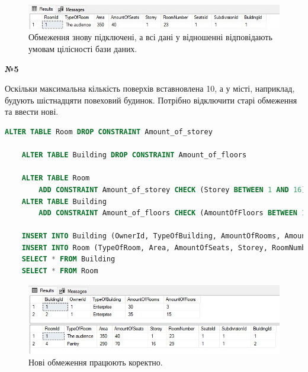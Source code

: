 \documentclass[a4paper,12pt]{article}
\begin{document}
	\begin{figure}[h!]
		\centering
		\begin{minipage}[h]{1.05\linewidth}
			\includegraphics[width=1\linewidth]{Prt sc/Figure_3.jpg}  
		\end{minipage}
		\caption{Обмеження знову підключені, а всі дані у відношенні відповідають умовам цілісності бази даних.}
	\end{figure}
	\begin{center}
		\textbf{№5}
	\end{center}
	Оскільки максимальна кількість поверхів вставновлена 10, а у місті, наприклад, будують шістнадцяти повеховий будинок. Потрібно відключити старі обмеження та ввести нові.
	\begin{lstlisting}[language=SQL]
	ALTER TABLE Room DROP CONSTRAINT Amount_of_storey
	
	ALTER TABLE Building DROP CONSTRAINT Amount_of_floors
	
	ALTER TABLE Room
		ADD CONSTRAINT Amount_of_storey CHECK (Storey BETWEEN 1 AND 16)
	ALTER TABLE Building
		ADD CONSTRAINT Amount_of_floors CHECK (AmountOfFloors BETWEEN 1 AND 16)
	
	INSERT INTO Building (OwnerId, TypeOfBuilding, AmountOfRooms, AmountOfFloors) VALUES (1, 'Enterprise', 35, 15);
	INSERT INTO Room (TypeOfRoom, Area, AmountOfSeats, Storey, RoomNumber, SeatsId, SubdivisionId, BiuldingId) VALUES ('Pantry', 290, 70, 16, 29, 1, 1, 2);
	SELECT * FROM Building
	SELECT * FROM Room
	\end{lstlisting}
\newpage
	\begin{figure}[h!]
		\centering
		\begin{minipage}[h]{1.05\linewidth}
			\includegraphics[width=1\linewidth]{Prt sc/Figure_4.jpg}  
		\end{minipage}
		\caption{Нові обмеження працюють коректно.}
	\end{figure}
	
\end{document}
